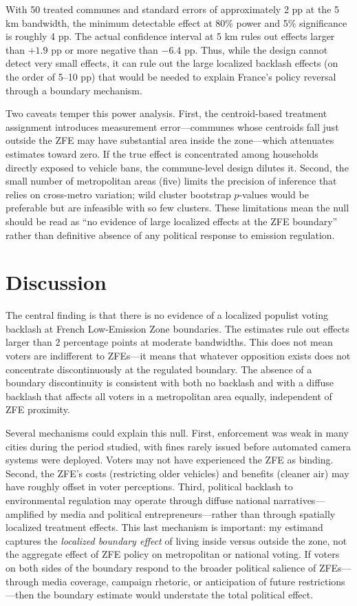 \documentclass[12pt]{article}
\begin{document}
With 50 treated communes and standard errors of approximately 2 pp at the 5 km bandwidth, the minimum detectable effect at 80\% power and 5\% significance is roughly 4 pp. The actual confidence interval at 5 km rules out effects larger than $+1.9$ pp or more negative than $-6.4$ pp. Thus, while the design cannot detect very small effects, it can rule out the large localized backlash effects (on the order of 5--10 pp) that would be needed to explain France's policy reversal through a boundary mechanism.

Two caveats temper this power analysis. First, the centroid-based treatment assignment introduces measurement error---communes whose centroids fall just outside the ZFE may have substantial area inside the zone---which attenuates estimates toward zero. If the true effect is concentrated among households directly exposed to vehicle bans, the commune-level design dilutes it. Second, the small number of metropolitan areas (five) limits the precision of inference that relies on cross-metro variation; wild cluster bootstrap $p$-values would be preferable but are infeasible with so few clusters. These limitations mean the null should be read as ``no evidence of large localized effects at the ZFE boundary'' rather than definitive absence of any political response to emission regulation.

\section{Discussion}

The central finding is that there is no evidence of a localized populist voting backlash at French Low-Emission Zone boundaries. The estimates rule out effects larger than 2 percentage points at moderate bandwidths. This does not mean voters are indifferent to ZFEs---it means that whatever opposition exists does not concentrate discontinuously at the regulated boundary. The absence of a boundary discontinuity is consistent with both no backlash and with a diffuse backlash that affects all voters in a metropolitan area equally, independent of ZFE proximity.

Several mechanisms could explain this null. First, enforcement was weak in many cities during the period studied, with fines rarely issued before automated camera systems were deployed. Voters may not have experienced the ZFE as binding. Second, the ZFE's costs (restricting older vehicles) and benefits (cleaner air) may have roughly offset in voter perceptions. Third, political backlash to environmental regulation may operate through diffuse national narratives---amplified by media and political entrepreneurs---rather than through spatially localized treatment effects. This last mechanism is important: my estimand captures the \textit{localized boundary effect} of living inside versus outside the zone, not the aggregate effect of ZFE policy on metropolitan or national voting. If voters on both sides of the boundary respond to the broader political salience of ZFEs---through media coverage, campaign rhetoric, or anticipation of future restrictions---then the boundary estimate would understate the total political effect.
\end{document}
